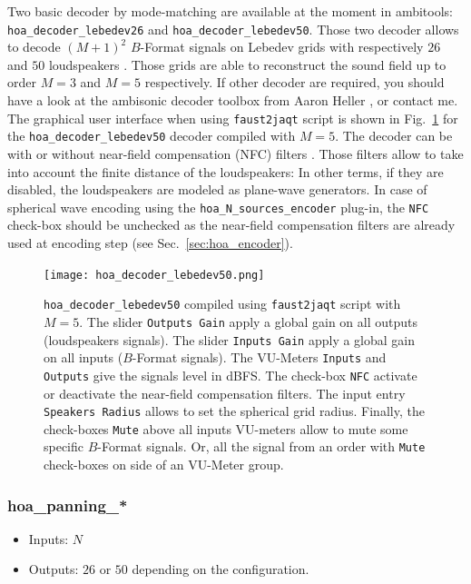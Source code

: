 \documentclass[10pt,a4paper]{article}
\begin{document}
Two basic decoder by mode-matching \cite{daniel2000representation,poletti2005three} are available at the moment in ambitools: \lstinline'hoa_decoder_lebedev26' and
\lstinline'hoa_decoder_lebedev50'. Those two decoder allows to decode $(M+1)^2$ $B$-Format signals on Lebedev grids with respectively $26$ and $50$ loudspeakers \cite{lebedev1975values,lecomte2015on}. Those grids are able to reconstruct the sound field up to order $M=3$ and $M=5$ respectively.
If other decoder are required, you should have a look at the ambisonic decoder toolbox from Aaron Heller \cite{heller2012toolkit}, or contact me. The graphical user interface when using \lstinline'faust2jaqt' script is shown in Fig.~\ref{fig:hoa_decoder_lebedev50} for the \lstinline'hoa_decoder_lebedev50' decoder compiled with $M=5$. The decoder can be with or without near-field compensation (NFC) filters \cite{daniel2003further,lecomte2015real}. Those filters allow to take into account the finite distance of the loudspeakers: In other terms, if they are disabled, the loudspeakers are modeled as plane-wave generators. In case of spherical wave encoding using the \lstinline'hoa_N_sources_encoder' plug-in, the \lstinline'NFC' check-box should be unchecked as the near-field compensation filters are already used at encoding step (see Sec.~\ref{sec:hoa_encoder}).
\begin{figure}[!ht]
\texttt{[image: hoa\_decoder\_lebedev50.png]}
\caption{\lstinline'hoa_decoder_lebedev50' compiled using \lstinline'faust2jaqt' script with $M=5$. The slider \lstinline'Outputs Gain' apply a global gain on all outputs (loudspeakers signals). The slider \lstinline'Inputs Gain' apply a global gain on all inputs ($B$-Format signals). The VU-Meters \lstinline'Inputs' and \lstinline'Outputs' give the signals level in dBFS. The check-box \lstinline'NFC' activate or deactivate the near-field compensation filters. The input entry \lstinline'Speakers Radius' allows to set the spherical grid radius. Finally, the check-boxes \lstinline'Mute' above all inputs VU-meters allow to mute some specific $B$-Format signals. Or, all the signal from an order with \lstinline'Mute' check-boxes on side of an VU-Meter group.}
\label{fig:hoa_decoder_lebedev50}
\end{figure}

\pagebreak
\subsubsection{hoa\_panning\_*}
\label{section:hoa_panning}
\begin{itemize}
\item Inputs: $N$
\item Outputs: $26$ or $50$ depending on the configuration.
\end{itemize}
\end{document}
